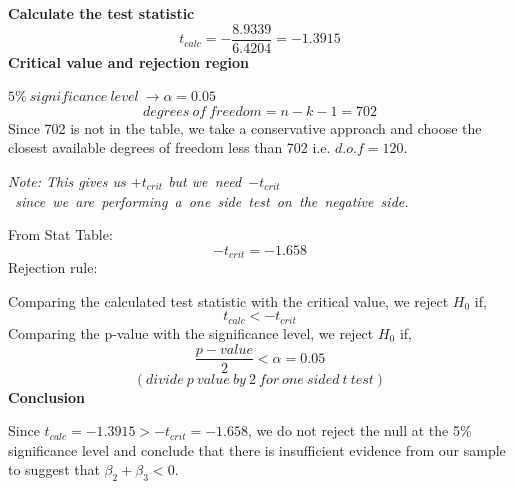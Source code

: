 \documentclass[12pt]{report}
\begin{document}
\noindent \textbf{Calculate the test statistic}
$$t_{calc} = -\dfrac{8.9339}{6.4204} = -1.3915$$
\noindent \textbf{Critical value and rejection region}

\noindent $5\%\ significance\ level\ \to \alpha = 0.05$ $$degrees\ of\ freedom = n - k - 1 = 702$$
\noindent Since 702 is not in the table, we take a conservative approach and choose the closest available degrees of freedom less than 702 i.e. $d.o.f=120$. 

\noindent \textit{Note: This gives us $+t_{crit}$ but we\ need\ $-t_{crit}$\ since\ we\ are\ performing\ a\ one\ side\ test\ on\ the\ negative\ side.}

\noindent From Stat Table:
$$-t_{crit} = -1.658$$
\noindent Rejection rule: 

\noindent Comparing the calculated test statistic with the critical value, we reject $H_0$ if,
$$t_{calc} < -t_{crit}$$
\noindent Comparing the p-value with the significance level, we reject $H_0$ if,
$$\dfrac{p-value}{2} < \alpha = 0.05$$ $$(divide\ p\ value\ by\ 2\ for\ one\ sided\ t\ test)$$
\noindent \textbf{Conclusion}

\noindent Since $t_{calc} =-1.3915 > -t_{crit} = -1.658$, we do not reject the null at the 5\% significance level and conclude that there is insufficient evidence from our sample to suggest that $\beta_2 + \beta_3 < 0$.
\end{document}
